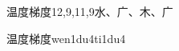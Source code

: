 \begin{entry}{温度梯度}{12,9,11,9}{⽔、⼴、⽊、⼴}
  \begin{phonetics}{温度梯度}{wen1du4ti1du4}
  \end{phonetics}
\end{entry}
